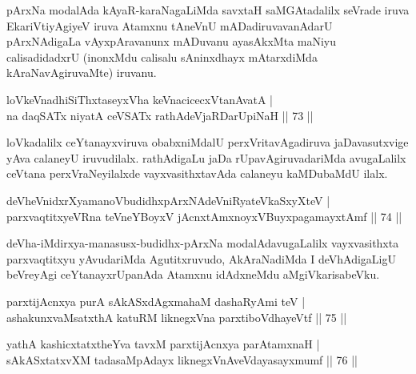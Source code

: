 \begin{artha}
pArxNa modalAda kAyaR-karaNagaLiMda  savxtaH saMGAtadalilx seVrade iruva EkariVtiyAgiyeV iruva Atamxnu tAneVnU mADadiruvavanAdarU pArxNAdigaLa vAyxpAravanunx mADuvanu ayasAkxMta maNiyu calisadidadxrU (inonxMdu calisalu sAninxdhayx mAtarxdiMda kAraNavAgiruvaMte) iruvanu.
\end{artha}


\begin{shl}
loVkeV\s nadhiSiThxtaseyxVha keVnacicecxVtanAvatA |\\
na daqSATx niyatA ceVSATx rathAdeVjaRDarUpiNaH \hfill || 73 ||
\end{shl}

\begin{artha}
loVkadalilx ceYtanayxviruva obabxniMdalU perxVritavAgadiruva jaDavasutxvige yAva calaneyU iruvudilalx. rathAdigaLu jaDa rUpavAgiruvadariMda avugaLalilx ceVtana perxVraNeyilalxde vayxvasithxtavAda calaneyu kaMDubaMdU ilalx.
\end{artha}%

\begin{shl}
deVheVnidxrXyamanoVbudidhxpArxNAdeVniRyateVkaSxyXteV |\\
parxvaqtitxyeVRna teVneYBoyxV jAcnxtAmx\s noyxV\s BuyxpagamayxtAmf \hfill || 74 ||
\end{shl}

\begin{artha}
deVha-iMdirxya-manasusx-budidhx-pArxNa modalAdavugaLalilx vayxvasithxta parxvaqtitxyu yAvudariMda Agutitxruvudo, AkAraNadiMda I deVhAdigaLigU beVreyAgi ceYtanayxrUpanAda Atamxnu idAdxneMdu aMgiVkarisabeVku.
\end{artha}


\begin{shl}
parxtijAcnxya purA sAkASxdAgxmahaM dashaRyAmi teV |\\
ashakunxvaMsatxthA katuRM liknegxVna parxtiboVdhayeVtf \hfill || 75 ||
\end{shl}

\begin{shl}
yathA kashicxtatxtheYva tavxM parxtijAcnxya parAtamxnaH |\\
sAkASxtatxvXM tadasaMpAdayx liknegxVnA\s \s veVdayasayxmumf \hfill || 76 ||
\end{shl}

